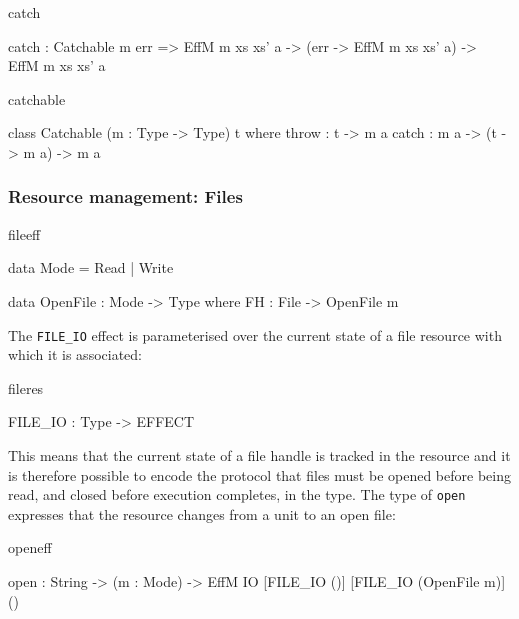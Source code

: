 \begin{SaveVerbatim}{catch}

catch : Catchable m err =>
        EffM m xs xs' a -> (err -> EffM m xs xs' a) ->
        EffM m xs xs' a

\end{SaveVerbatim}

\begin{SaveVerbatim}{catchable}

class Catchable (m : Type -> Type) t where
    throw : t -> m a
    catch : m a -> (t -> m a) -> m a

\end{SaveVerbatim}



\subsubsection{Resource management: Files}

\begin{SaveVerbatim}{fileeff}

data Mode = Read | Write

data OpenFile : Mode -> Type where
     FH : File -> OpenFile m

\end{SaveVerbatim}

\noindent
The \texttt{FILE\_IO} effect is parameterised over the current state of a
file resource with which it is associated:

\begin{SaveVerbatim}{fileres}

FILE_IO : Type -> EFFECT

\end{SaveVerbatim}

\noindent
This means that the current state of a file handle is tracked in the resource
and it is therefore possible to encode the protocol that files must be opened
before being read, and closed before execution completes, in the type.
The type of \texttt{open} expresses that the resource changes from a unit
to an open file:

\begin{SaveVerbatim}{openeff}

open : String -> (m : Mode) -> 
       EffM IO [FILE_IO ()] [FILE_IO (OpenFile m)] ()

\end{SaveVerbatim}

